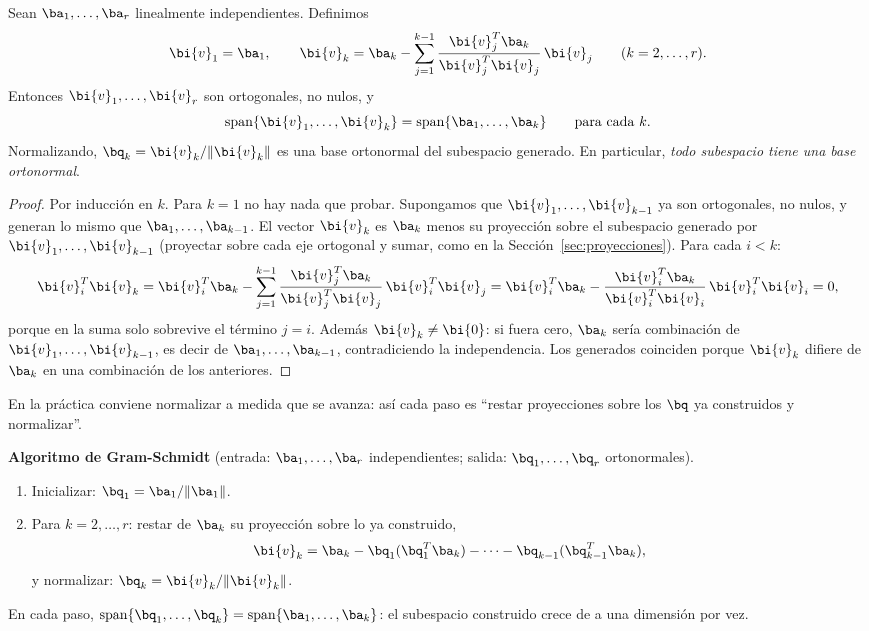 \begin{teorema}\label{teo:gram-schmidt}
Sean $\ba_1,\dots,\ba_r$ linealmente independientes. Definimos
\[
\bi{v}_1=\ba_1,\qquad
\bi{v}_k=\ba_k-\sum_{j=1}^{k-1}
\frac{\bi{v}_j^T\ba_k}{\bi{v}_j^T\bi{v}_j}\,\bi{v}_j
\qquad (k=2,\dots,r).
\]
Entonces $\bi{v}_1,\dots,\bi{v}_r$ son ortogonales, no nulos, y
\[
\hbox{span}\{\bi{v}_1,\dots,\bi{v}_k\}=\hbox{span}\{\ba_1,\dots,\ba_k\}
\qquad\text{para cada }k .
\]
Normalizando, $\bq_k=\bi{v}_k/\|\bi{v}_k\|$ es una base ortonormal del
subespacio generado. En particular, \emph{todo subespacio tiene una base
ortonormal}.
\end{teorema}

\begin{proof}
Por inducción en $k$. Para $k=1$ no hay nada que probar. Supongamos que
$\bi{v}_1,\dots,\bi{v}_{k-1}$ ya son ortogonales, no nulos, y generan lo
mismo que $\ba_1,\dots,\ba_{k-1}$. El vector $\bi{v}_k$ es $\ba_k$ menos su
proyección sobre el subespacio generado por
$\bi{v}_1,\dots,\bi{v}_{k-1}$ (proyectar sobre cada eje ortogonal y sumar,
como en la Sección~\ref{sec:proyecciones}). Para cada $i<k$:
\[
\bi{v}_i^T\bi{v}_k
=\bi{v}_i^T\ba_k-\sum_{j=1}^{k-1}
\frac{\bi{v}_j^T\ba_k}{\bi{v}_j^T\bi{v}_j}\,
\bi{v}_i^T\bi{v}_j
=\bi{v}_i^T\ba_k
-\frac{\bi{v}_i^T\ba_k}{\bi{v}_i^T\bi{v}_i}\,
\bi{v}_i^T\bi{v}_i=0 ,
\]
porque en la suma solo sobrevive el término $j=i$. Además
$\bi{v}_k\ne\bi{0}$: si fuera cero, $\ba_k$ sería combinación de
$\bi{v}_1,\dots,\bi{v}_{k-1}$, es decir de $\ba_1,\dots,\ba_{k-1}$,
contradiciendo la independencia. Los generados coinciden porque $\bi{v}_k$
difiere de $\ba_k$ en una combinación de los anteriores.
\end{proof}

En la práctica conviene normalizar a medida que se avanza: así cada paso es
``restar proyecciones sobre los $\bq$ ya construidos y normalizar''.

\begin{caja}
\textbf{Algoritmo de Gram-Schmidt} (entrada: $\ba_1,\dots,\ba_r$
independientes; salida: $\bq_1,\dots,\bq_r$ ortonormales).
\begin{enumerate}[leftmargin=*,itemsep=1pt]
\item Inicializar: $\bq_1=\ba_1/\|\ba_1\|$.
\item Para $k=2,\dots,r$: restar de $\ba_k$ su proyección sobre lo ya
construido,
\[
\bi{v}_k=\ba_k-\bq_1(\bq_1^T\ba_k)-\cdots
-\bq_{k-1}(\bq_{k-1}^T\ba_k),
\]
y normalizar: $\bq_k=\bi{v}_k/\|\bi{v}_k\|$.
\end{enumerate}
En cada paso, $\hbox{span}\{\bq_1,\dots,\bq_k\}=\hbox{span}\{\ba_1,\dots,\ba_k\}$: el
subespacio construido crece de a una dimensión por vez.
\end{caja}

